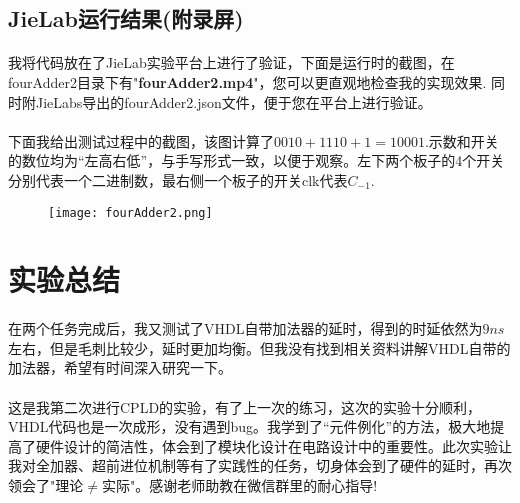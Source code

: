 \documentclass[UTF8, onecolumn, a4paper]{article}
\begin{document}
\subsection{JieLab运行结果(附录屏)}
\paragraph*{}
我将代码放在了JieLab实验平台上进行了验证，下面是运行时的截图，在fourAdder2目录下有"\textbf{fourAdder2.mp4}"，您可以更直观地检查我的实现效果. 同时附JieLabs导出的fourAdder2.json文件，便于您在平台上进行验证。
\paragraph*{}
下面我给出测试过程中的截图，该图计算了$0010 + 1110 + 1 = 10001$.示数和开关的数位均为“左高右低”，与手写形式一致，以便于观察。左下两个板子的4个开关分别代表一个二进制数，最右侧一个板子的开关clk代表$C_{-1}$.
\begin{figure}[htb]
	\centering
	\texttt{[image: fourAdder2.png]}
\end{figure}


\section{实验总结}
\paragraph*{}
在两个任务完成后，我又测试了VHDL自带加法器的延时，得到的时延依然为$9ns$左右，但是毛刺比较少，延时更加均衡。但我没有找到相关资料讲解VHDL自带的加法器，希望有时间深入研究一下。
\paragraph*{}
这是我第二次进行CPLD的实验，有了上一次的练习，这次的实验十分顺利，VHDL代码也是一次成形，没有遇到bug。我学到了“元件例化”的方法，极大地提高了硬件设计的简洁性，体会到了模块化设计在电路设计中的重要性。此次实验让我对全加器、超前进位机制等有了实践性的任务，切身体会到了硬件的延时，再次领会了"理论$\neq$实际"。感谢老师助教在微信群里的耐心指导!
\end{document}
